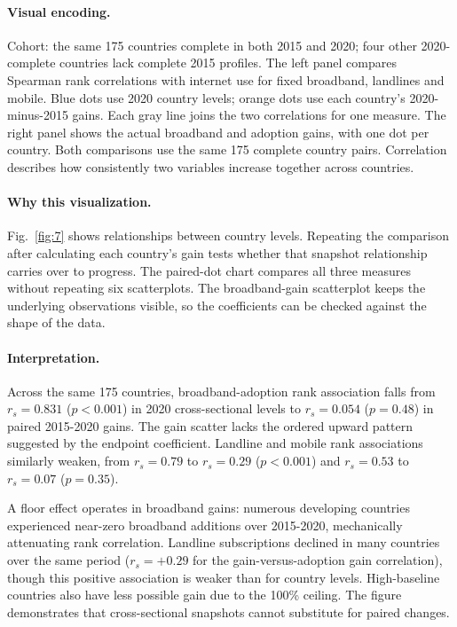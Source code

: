 \documentclass[conference,a4paper]{IEEEtran}
\begin{document}
\paragraph{Visual encoding.} Cohort: the same 175 countries complete in both 2015 and 2020; four other 2020-complete countries lack complete 2015 profiles. The left panel compares Spearman rank correlations with internet use for fixed broadband, landlines and mobile. Blue dots use 2020 country levels; orange dots use each country's 2020-minus-2015 gains. Each gray line joins the two correlations for one measure. The right panel shows the actual broadband and adoption gains, with one dot per country. Both comparisons use the same 175 complete country pairs. Correlation describes how consistently two variables increase together across countries.



\paragraph{Why this visualization.} Fig.~\ref{fig:7} shows relationships between country levels. Repeating the comparison after calculating each country's gain tests whether that snapshot relationship carries over to progress. The paired-dot chart compares all three measures without repeating six scatterplots. The broadband-gain scatterplot keeps the underlying observations visible, so the coefficients can be checked against the shape of the data.



\paragraph{Interpretation.} Across the same 175 countries, broadband-adoption rank association falls from $r_s = 0.831$ ($p < 0.001$) in 2020 cross-sectional levels to $r_s = 0.054$ ($p = 0.48$) in paired 2015-2020 gains. The gain scatter lacks the ordered upward pattern suggested by the endpoint coefficient. Landline and mobile rank associations similarly weaken, from $r_s = 0.79$ to $r_s = 0.29$ ($p < 0.001$) and $r_s = 0.53$ to $r_s = 0.07$ ($p = 0.35$).

A floor effect operates in broadband gains: numerous developing countries experienced near-zero broadband additions over 2015-2020, mechanically attenuating rank correlation. Landline subscriptions declined in many countries over the same period ($r_s = +0.29$ for the gain-versus-adoption gain correlation), though this positive association is weaker than for country levels. High-baseline countries also have less possible gain due to the 100\% ceiling. The figure demonstrates that cross-sectional snapshots cannot substitute for paired changes.
\end{document}
